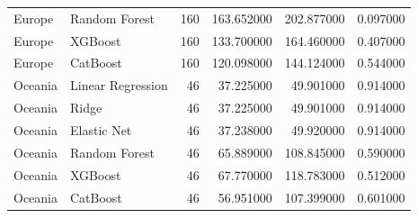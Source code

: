 \begin{longtable}{llrrrr}
Europe & Random Forest & 160 & 163.652000 & 202.877000 & 0.097000 \\
Europe & XGBoost & 160 & 133.700000 & 164.460000 & 0.407000 \\
Europe & CatBoost & 160 & 120.098000 & 144.124000 & 0.544000 \\
Oceania & Linear Regression & 46 & 37.225000 & 49.901000 & 0.914000 \\
Oceania & Ridge & 46 & 37.225000 & 49.901000 & 0.914000 \\
Oceania & Elastic Net & 46 & 37.238000 & 49.920000 & 0.914000 \\
Oceania & Random Forest & 46 & 65.889000 & 108.845000 & 0.590000 \\
Oceania & XGBoost & 46 & 67.770000 & 118.783000 & 0.512000 \\
Oceania & CatBoost & 46 & 56.951000 & 107.399000 & 0.601000 \\
\end{longtable}
